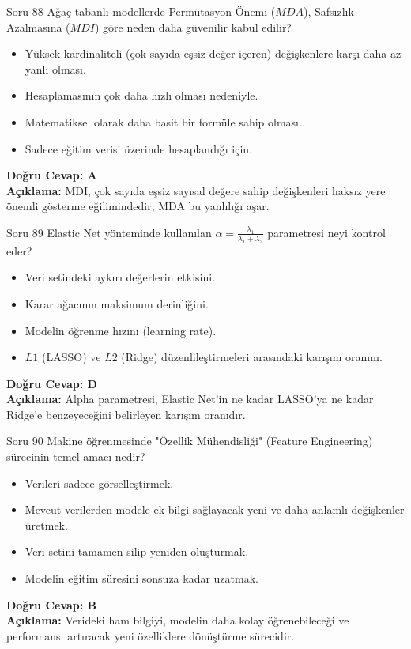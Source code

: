 \documentclass[12pt,a4paper]{article}
\begin{document}
\begin{testcard}{Soru 88}
    Ağaç tabanlı modellerde Permütasyon Önemi ($MDA$), Safsızlık Azalmasına ($MDI$) göre neden daha güvenilir kabul edilir?
    \begin{itemize}
        \item[A)] Yüksek kardinaliteli (çok sayıda eşsiz değer içeren) değişkenlere karşı daha az yanlı olması.
        \item[B)] Hesaplamasının çok daha hızlı olması nedeniyle.
        \item[C)] Matematiksel olarak daha basit bir formüle sahip olması.
        \item[D)] Sadece eğitim verisi üzerinde hesaplandığı için.
    \end{itemize}
    \tcblower
    \textbf{Doğru Cevap: A} \\
    \textbf{Açıklama:} MDI, çok sayıda eşsiz sayısal değere sahip değişkenleri haksız yere önemli gösterme eğilimindedir; MDA bu yanlılığı aşar.
\end{testcard}

\begin{testcard}{Soru 89}
    Elastic Net yönteminde kullanılan $\alpha = \frac{\lambda_1}{\lambda_1 + \lambda_2}$ parametresi neyi kontrol eder?
    \begin{itemize}
        \item[A)] Veri setindeki aykırı değerlerin etkisini.
        \item[B)] Karar ağacının maksimum derinliğini.
        \item[C)] Modelin öğrenme hızını (learning rate).
        \item[D)] $L1$ (LASSO) ve $L2$ (Ridge) düzenlileştirmeleri arasındaki karışım oranını.
    \end{itemize}
    \tcblower
    \textbf{Doğru Cevap: D} \\
    \textbf{Açıklama:} Alpha parametresi, Elastic Net'in ne kadar LASSO'ya ne kadar Ridge'e benzeyeceğini belirleyen karışım oranıdır.
\end{testcard}

\begin{testcard}{Soru 90}
    Makine öğrenmesinde "Özellik Mühendisliği" (Feature Engineering) sürecinin temel amacı nedir?
    \begin{itemize}
        \item[A)] Verileri sadece görselleştirmek.
        \item[B)] Mevcut verilerden modele ek bilgi sağlayacak yeni ve daha anlamlı değişkenler üretmek.
        \item[C)] Veri setini tamamen silip yeniden oluşturmak.
        \item[D)] Modelin eğitim süresini sonsuza kadar uzatmak.
    \end{itemize}
    \tcblower
    \textbf{Doğru Cevap: B} \\
    \textbf{Açıklama:} Verideki ham bilgiyi, modelin daha kolay öğrenebileceği ve performansı artıracak yeni özelliklere dönüştürme sürecidir.
\end{testcard}

\newpage

\end{document}
